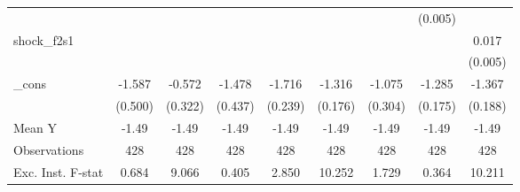 {\begin{tabular}{l*{8}{c}}
            &                     &                     &                     &                     &                     &                     &     (0.005)         &                     \\
\addlinespace
shock\_f2s1  &                     &                     &                     &                     &                     &                     &                     &       0.017\sym{***}\\
            &                     &                     &                     &                     &                     &                     &                     &     (0.005)         \\
\addlinespace
\_cons      &      -1.587\sym{***}&      -0.572\sym{*}  &      -1.478\sym{***}&      -1.716\sym{***}&      -1.316\sym{***}&      -1.075\sym{***}&      -1.285\sym{***}&      -1.367\sym{***}\\
            &     (0.500)         &     (0.322)         &     (0.437)         &     (0.239)         &     (0.176)         &     (0.304)         &     (0.175)         &     (0.188)         \\
\midrule
Mean Y      &       -1.49         &       -1.49         &       -1.49         &       -1.49         &       -1.49         &       -1.49         &       -1.49         &       -1.49         \\
Observations&         428         &         428         &         428         &         428         &         428         &         428         &         428         &         428         \\
Exc. Inst. F-stat&       0.684         &       9.066         &       0.405         &       2.850         &      10.252         &       1.729         &       0.364         &      10.211         \\
\bottomrule
\end{tabular}
}
